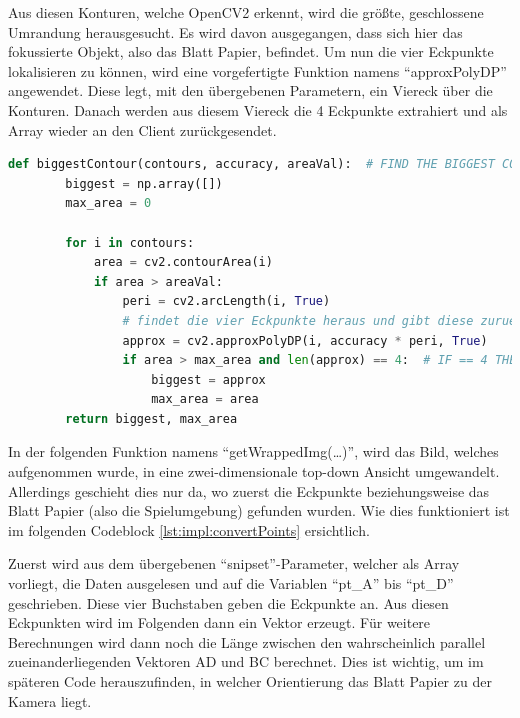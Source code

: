 Aus diesen Konturen, welche OpenCV2 erkennt, wird die größte, geschlossene Umrandung herausgesucht. Es wird davon ausgegangen, dass sich hier das fokussierte Objekt, also das Blatt Papier, befindet. Um nun die vier Eckpunkte lokalisieren zu können, wird eine vorgefertigte Funktion namens ``approxPolyDP'' angewendet. Diese legt, mit den übergebenen Parametern, ein Viereck über die Konturen. Danach werden aus diesem Viereck die 4 Eckpunkte extrahiert und als Array wieder an den Client zurückgesendet.


\begin{lstlisting}[caption=approxPolyDP,language=Python,label=lst:impl:findBiggestContour]
    def biggestContour(contours, accuracy, areaVal):  # FIND THE BIGGEST CONTOUR
        biggest = np.array([])
        max_area = 0

        for i in contours:
            area = cv2.contourArea(i)
            if area > areaVal:
                peri = cv2.arcLength(i, True)
                # findet die vier Eckpunkte heraus und gibt diese zurueck
                approx = cv2.approxPolyDP(i, accuracy * peri, True)
                if area > max_area and len(approx) == 4:  # IF == 4 THEN SQUARE
                    biggest = approx
                    max_area = area
        return biggest, max_area
\end{lstlisting}

In der folgenden Funktion namens ``getWrappedImg(\dots)'', wird das Bild, welches aufgenommen wurde, in eine zwei-dimensionale top-down Ansicht umgewandelt. Allerdings geschieht dies nur da, wo zuerst die Eckpunkte beziehungsweise das Blatt Papier (also die Spielumgebung) gefunden wurden. Wie dies funktioniert ist im folgenden Codeblock
\ref{lst:impl:convertPoints} ersichtlich.


Zuerst wird aus dem übergebenen ``snipset''-Parameter, welcher als Array vorliegt, die Daten ausgelesen und auf die Variablen ``pt\_A'' bis ``pt\_D'' geschrieben. Diese vier Buchstaben geben die Eckpunkte an. Aus diesen Eckpunkten wird im Folgenden dann ein Vektor erzeugt. Für weitere Berechnungen wird dann noch die Länge zwischen den wahrscheinlich parallel zueinanderliegenden Vektoren AD und BC berechnet. Dies ist wichtig, um im späteren Code herauszufinden, in welcher Orientierung das Blatt Papier zu der Kamera liegt.

